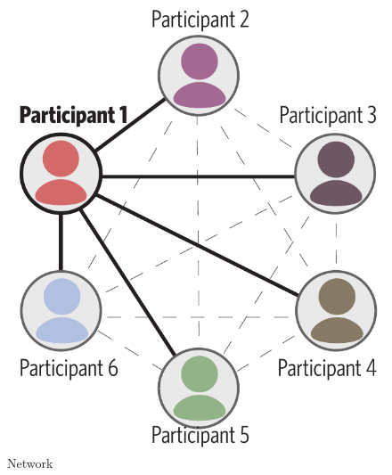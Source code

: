 \documentclass[11pt, floatsintext]{apa6}
\begin{document}
\begin{figure}[t!]
\centering
    \includegraphics[scale=.32]{task1_network.pdf}
  \caption{Network}%
  \label{fig:task1_network}
\end{figure}
\end{document}
